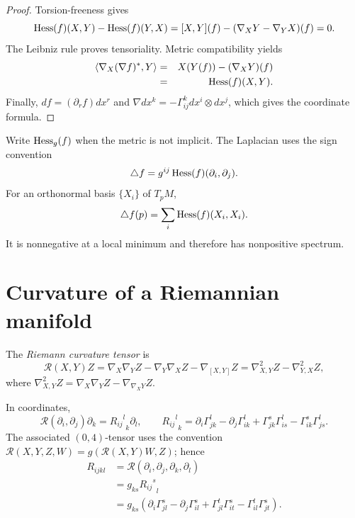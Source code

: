 \begin{proof}
\sketch

Torsion-freeness gives
\[
  \operatorname{Hess}(f)(X,Y)-\operatorname{Hess}(f)(Y,X)
  =[X,Y](f)-(\nabla_XY-\nabla_YX)(f)=0.
\]
The Leibniz rule proves tensoriality. Metric compatibility yields
\begin{eqnarray}\label{hessform}
\langle\nabla_X(\nabla f)^*,Y\rangle
&=&X(Y(f))-(\nabla_XY)(f)\\
&=&\operatorname{Hess}(f)(X,Y).\nonumber
\end{eqnarray}
Finally, $df=(\partial_rf)dx^r$ and
$\nabla dx^k=-\Gamma^k_{ij}dx^i\otimes dx^j$, which gives the
coordinate formula.
\end{proof}

Write $\operatorname{Hess}_g(f)$ when the metric is not implicit. The Laplacian uses
the sign convention
\[
  \triangle f=g^{ij}\operatorname{Hess}(f)(\partial_i,\partial_j).
\]
For an orthonormal basis $\{X_i\}$ of $T_pM$,
\begin{equation}\label{laplacformula}
  \triangle f(p)=\sum_i\operatorname{Hess}(f)(X_i,X_i).
\end{equation}
It is nonnegative at a local minimum and therefore has nonpositive
spectrum.

\section{Curvature of a Riemannian manifold}

\begin{definition}
\label{def:riemann-curvature-tensor}





The \emph{Riemann curvature tensor} is
\[
  \mathcal R(X,Y)Z
  =\nabla_X\nabla_YZ-\nabla_Y\nabla_XZ-\nabla_{[X,Y]}Z
  =\nabla^2_{X,Y}Z-\nabla^2_{Y,X}Z,
\]
where $\nabla^2_{X,Y}Z=\nabla_X\nabla_YZ-\nabla_{\nabla_XY}Z$.
\end{definition}

In coordinates,
\[
  \mathcal R(\partial_i,\partial_j)\partial_k
  ={{R_{ij}}^l}_k\partial_l,
  \qquad
  {{R_{ij}}^l}_k
  =\partial_i\Gamma^l_{jk}-\partial_j\Gamma^l_{ik}
   +\Gamma^s_{jk}\Gamma^l_{is}-\Gamma^s_{ik}\Gamma^l_{js}.
\]
The associated $(0,4)$-tensor uses the convention
$\mathcal R(X,Y,Z,W)=g(\mathcal R(X,Y)W,Z)$; hence
\begin{align*}
  R_{ijkl}
  &=\mathcal R(\partial_i,\partial_j,\partial_k,\partial_l)\\
  &=g_{ks}{{R_{ij}}^s}_l\\
  &=g_{ks}(\partial_i\Gamma^s_{jl}-\partial_j\Gamma^s_{il}
    +\Gamma^t_{jl}\Gamma^s_{it}-\Gamma^t_{il}\Gamma^s_{jt}).
\end{align*}

